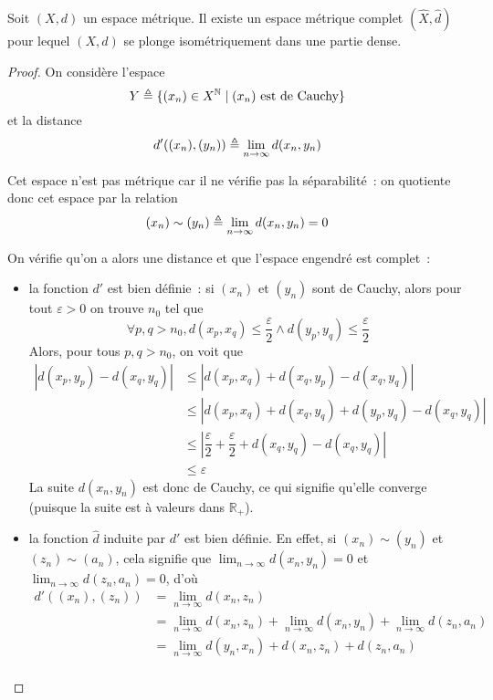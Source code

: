 \begin{proposition}
  Soit $(X,d)$ un espace métrique. Il existe un espace métrique complet
  $(\hat X,\hat d)$ pour lequel $(X,d)$ se plonge isométriquement dans une
  partie dense.
\end{proposition}

\begin{proof}
  On considère l'espace
  \[Y \triangleq \{(x_n)\in X^{\mathbb N}\mid (x_n)\text{ est de Cauchy}\}\]
  et la distance
  \[d'((x_n),(y_n)) \triangleq \lim_{n \to \infty} d(x_n,y_n)\]

  Cet espace n'est pas métrique car il ne vérifie pas la séparabilité~: on
  quotiente donc cet espace par la relation
  \[(x_n)\sim (y_n) \triangleq \lim_{n\to\infty} d(x_n,y_n) = 0\]

  On vérifie qu'on a alors une distance et que l'espace engendré est complet~:
  \begin{itemize}
  \item la fonction $d'$ est bien définie~: si $(x_n)$ et $(y_n)$ sont de
    Cauchy, alors pour tout $\varepsilon > 0$ on trouve $n_0$ tel que
    \[\forall p,q > n_0, d(x_p,x_q) \leq \dfrac{\varepsilon}{2}
    \land d(y_p,y_q) \leq \dfrac{\varepsilon}{2}\]
    Alors, pour tous $p,q > n_0$, on voit que
    \begin{align*}
      |d(x_p,y_p) - d(x_q,y_q)| &\leq |d(x_p,x_q) + d(x_q,y_p) - d(x_q,y_q)|\\
      &\leq |d(x_p,x_q) + d(x_q,y_q) + d(y_p,y_q) - d(x_q,y_q)|\\
      &\leq \left|\dfrac{\varepsilon}{2} + \dfrac{\varepsilon}{2}
      + d(x_q,y_q) - d(x_q,y_q)\right|\\
      &\leq \varepsilon
    \end{align*}
    La suite $d(x_n,y_n)$ est donc de Cauchy, ce qui signifie qu'elle converge
    (puisque la suite est à valeurs dans $\mathbb R_+$).
  \item la fonction $\hat d$ induite par $d'$ est bien définie. En effet, si
    $(x_n)\sim (y_n)$ et $(z_n)\sim (a_n)$, cela signifie que
    $\displaystyle\lim_{n\to\infty} d(x_n,y_n) = 0$ et
    $\displaystyle\lim_{n\to\infty}d(z_n,a_n) = 0$, d'où
    \begin{align*}
      d'((x_n),(z_n)) &= \displaystyle\lim_{n \to \infty} d(x_n,z_n)\\
      &= \lim_{n\to \infty} d(x_n,z_n) + \lim_{n\to\infty} d(x_n,y_n) +
      \lim_{n\to \infty} d(z_n,a_n)\\
      &= \lim_{n\to\infty} d(y_n,x_n) + d(x_n,z_n) + d(z_n,a_n)\\

\end{align*}
\end{itemize}
\end{proof}
